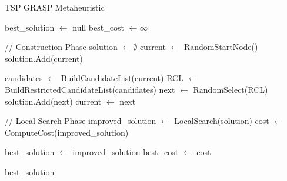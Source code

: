 \documentclass{article}
\begin{document}
\begin{algorithm}[!ht]
\caption{TSP GRASP Metaheuristic}
\begin{algorithmic}[1]
\State best\_solution $\gets$ null
\State best\_cost $\gets \infty$

	\State // Construction Phase
	\State solution $\gets \emptyset$
	\State current $\gets$ RandomStartNode()
	\State solution.Add(current)
	
		\State candidates $\gets$ BuildCandidateList(current)
		\State RCL $\gets$ BuildRestrictedCandidateList(candidates)
		\State next $\gets$ RandomSelect(RCL)
		\State solution.Add(next)
		\State current $\gets$ next
	\EndWhile
	
	\State // Local Search Phase
	\State improved\_solution $\gets$ LocalSearch(solution)
	\State cost $\gets$ ComputeCost(improved\_solution)
	
		\State best\_solution $\gets$ improved\_solution
		\State best\_cost $\gets$ cost
	\EndIf
\EndFor

\State \Return best\_solution
\EndProcedure
\end{algorithmic}
\end{algorithm}
\end{document}
